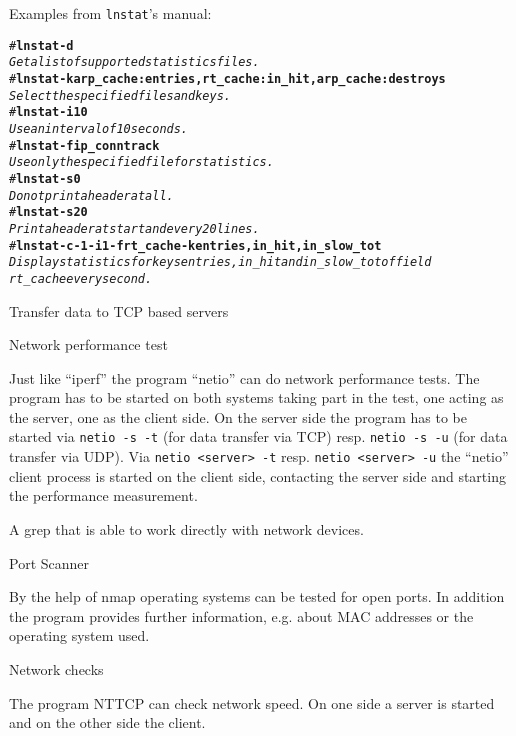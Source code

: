 \begin{description}
    Examples from \texttt{lnstat}'s manual:
    \begin{example}
    \begin{alltt}
    \# \textbf{lnstat -d}
        \textsl{Get a list of supported statistics files.}
    \# \textbf{lnstat -k arp_cache:entries,rt_cache:in_hit,arp_cache:destroys}
        \textsl{Select the specified files and keys.}
    \# \textbf{lnstat -i 10}
        \textsl{Use an interval of 10 seconds.}
    \# \textbf{lnstat -f ip_conntrack}
        \textsl{Use only the specified file for statistics.}
    \# \textbf{lnstat -s 0}
        \textsl{Do not print a header at all.}
    \# \textbf{lnstat -s 20}
        \textsl{Print a header at start and every 20 lines.}
    \# \textbf{lnstat -c -1 -i 1 -f rt_cache -k entries,in_hit,in_slow_tot}
        \textsl{Display statistics for keys entries, in_hit and in_slow_tot of field
        rt_cache every second.}
    \end{alltt}
    \end{example}

 Transfer data to TCP based servers

 Network performance test

    Just like ``iperf'' the program ``netio'' can do network performance tests.
    The program has to be started on both systems taking part in the test, one
    acting as the server, one as the client side.
    On the server side the program has to be started via
    \verb+netio -s -t+ (for data transfer via TCP) resp. \verb+netio -s -u+
    (for data transfer via UDP). Via \verb+netio <server> -t+ resp. \verb+netio <server> -u+
    the ``netio'' client process is started on the client side, contacting the server side
    and starting the performance measurement.

 A grep that is able to work directly with network devices.

 Port Scanner

    By the help of nmap operating systems can be tested for open ports.
    In addition the program provides further information, e.g. about
    MAC addresses or the operating system used.

 Network checks

    The program NTTCP can check network speed. On one side a server is started
    and on the other side the client.


\end{description}
